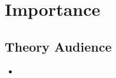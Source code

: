 \section{Importance}
\subsection{Theory Audience}
\begin{frame}
\begin{itemize}
\item
\end{itemize}
\end{frame}


